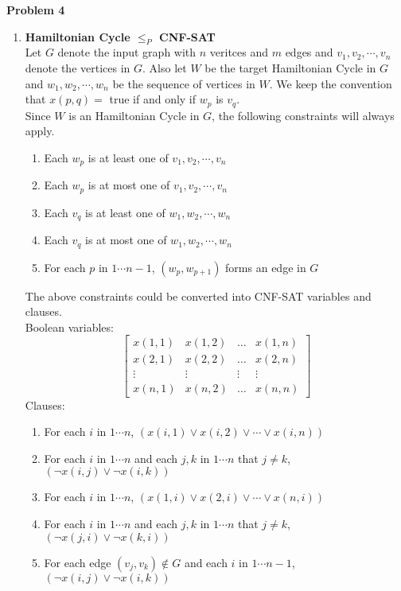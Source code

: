 \documentclass[12pt,letterpaper]{article}
\def\pp{\par\noindent}
\newcommand{\problem}[1]{ \bigskip \pp \textbf{Problem #1}\par}
\begin{document}
\problem{4}
\begin{enumerate}
	\item \textbf{Hamiltonian Cycle $\leq_P$ CNF-SAT}\\
		Let $G$ denote the input graph with $n$ veritces and $m$ edges and $v_1, v_2, \cdots, v_n$ denote the vertices in $G$.
		Also let $W$ be the target Hamiltonian Cycle in $G$ and $w_1, w_2, \cdots, w_n$ be the sequence of vertices in $W$.
		We keep the convention that $x(p, q) = $ true if and only if $w_p$ is $v_q$.\\
		Since $W$ is an Hamiltonian Cycle in $G$, the following constraints will always apply.
		\begin{enumerate}[itemsep=0mm]
			\item Each $w_p$ is at least one of $v_1, v_2, \cdots, v_n$
			\item Each $w_p$ is at most one of $v_1, v_2, \cdots, v_n$
			\item Each $v_q$ is at least one of $w_1, w_2, \cdots, w_n$
			\item Each $v_q$ is at most one of $w_1, w_2, \cdots, w_n$
			\item For each $p$ in $1\cdots n-1$, $(w_p, w_{p+1})$ forms an edge in $G$
		\end{enumerate}
		The above constraints could be converted into CNF-SAT variables and clauses.\\
		Boolean variables:
		\[
			\begin{bmatrix}
				x(1,1) & x(1,2) & \hdots & x(1,n)\\
				x(2,1) & x(2,2) & \hdots & x(2,n)\\
				\vdots & \vdots & \vdots & \vdots\\
				x(n,1) & x(n,2) & \hdots & x(n,n)
			\end{bmatrix}
		\]
		Clauses:
		\begin{enumerate}[itemsep=0mm]
			\item For each $i$ in $1\cdots n$, $(x(i,1) \vee x(i,2) \vee \cdots \vee x(i,n))$
			\item For each $i$ in $1\cdots n$ and each $j, k$ in $1\cdots n$ that $j\neq k$, $(\neg x(i,j) \vee \neg x(i,k))$
			\item For each $i$ in $1\cdots n$, $(x(1,i) \vee x(2,i) \vee \cdots \vee x(n,i))$
			\item For each $i$ in $1\cdots n$ and each $j, k$ in $1\cdots n$ that $j\neq k$, $(\neg x(j,i) \vee \neg x(k,i))$
			\item For each edge $(v_j, v_k) \notin G$ and each $i$ in $1\cdots n-1$, $(\neg x(i,j) \vee \neg x(i,k))$

\end{enumerate}
\end{enumerate}
\end{document}
